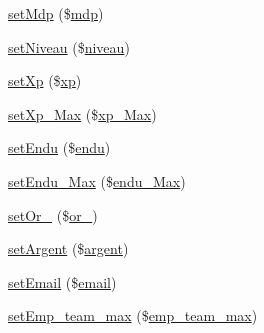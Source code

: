 \begin{DoxyCompactItemize}
\item 
\mbox{\hyperlink{class_user_a8e226641b5743164054123f3dbe3a341}{set\+Mdp}} (\$\mbox{\hyperlink{class_user_a11525bb64e691e68ccb43856433f5e71}{mdp}})
\item 
\mbox{\hyperlink{class_user_a84973efb146fe894e77bee5fe3b08f75}{set\+Niveau}} (\$\mbox{\hyperlink{class_user_ab341c8493decd7ed8ad872544a3b3332}{niveau}})
\item 
\mbox{\hyperlink{class_user_a84e2a4262b3229d9bdd3f5a56a2c5606}{set\+Xp}} (\$\mbox{\hyperlink{class_user_abc7ddb8ce5c319d13e15734bee03075b}{xp}})
\item 
\mbox{\hyperlink{class_user_af20c5c334c10fbacbf8204963f7c588a}{set\+Xp\+\_\+\+Max}} (\$\mbox{\hyperlink{class_user_a2826726689d756f84814487cf2823040}{xp\+\_\+\+Max}})
\item 
\mbox{\hyperlink{class_user_a08df42bf36aae3eb166e208ad689c814}{set\+Endu}} (\$\mbox{\hyperlink{class_user_aa7ae3e562d611c4cf112a618db183660}{endu}})
\item 
\mbox{\hyperlink{class_user_a91e7269dbfaf44b1cd2266d892f01a5a}{set\+Endu\+\_\+\+Max}} (\$\mbox{\hyperlink{class_user_a3c4f83665c4b093ac23cb1ef8c962b4e}{endu\+\_\+\+Max}})
\item 
\mbox{\hyperlink{class_user_ac5dfa43083d232944fa37624d190092e}{set\+Or\+\_\+}} (\$\mbox{\hyperlink{class_user_a1323f270a1285588987ef21bf704975c}{or\+\_\+}})
\item 
\mbox{\hyperlink{class_user_a1ec02d8692a7b6ae5e191f83c8e81659}{set\+Argent}} (\$\mbox{\hyperlink{class_user_a2a6a97a5e1ddb08da30802aec1b0eb0a}{argent}})
\item 
\mbox{\hyperlink{class_user_a018ae17e436e09134922835cdd3235a7}{set\+Email}} (\$\mbox{\hyperlink{class_user_afffcb74b0fe718305661fb57d5fdfde0}{email}})
\item 
\mbox{\hyperlink{class_user_a35862bf973a7ba7c0d3b84e834156e10}{set\+Emp\+\_\+team\+\_\+max}} (\$\mbox{\hyperlink{class_user_aa4d14a670efb836bee049266a044d818}{emp\+\_\+team\+\_\+max}})
\end{DoxyCompactItemize}
